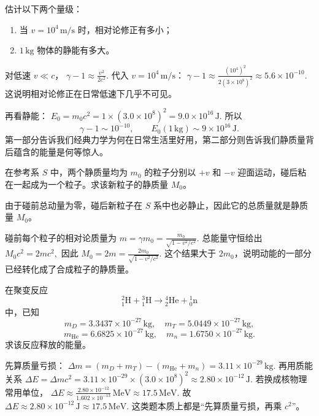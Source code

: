 \documentclass[lang=cn,11pt]{elegantbook}
\begin{document}
\begin{exercise}[低速修正量级与静能量级]
估计以下两个量级：
\begin{enumerate}
 \item 当 \(v=10^4\,\mathrm{m/s}\) 时，相对论修正有多小；
 \item \(1\,\mathrm{kg}\) 物体的静能有多大。
\end{enumerate}
\end{exercise}

\begin{solution}
对低速 \(v\ll c\)，
 \(\gamma-1\approx \frac{v^2}{2c^2}.\) 
代入 \(v=10^4\,\mathrm{m/s}\)：
 \(\gamma-1\approx \frac{(10^4)^2}{2(3\times 10^8)^2} \approx 5.6\times 10^{-10}.\) 
这说明相对论修正在日常低速下几乎不可见。

再看静能：
 \(E_0=m_0c^2=1\times (3.0\times 10^8)^2 =9.0\times 10^{16}\,\mathrm{J}.\) 
所以
\[
\boxed{\gamma-1\sim 10^{-10},\qquad E_0(1\,\mathrm{kg})\sim 9\times 10^{16}\,\mathrm{J}.}
\]
第一部分告诉我们经典力学为何在日常生活里好用，第二部分则告诉我们静质量背后蕴含的能量是何等惊人。
\end{solution}

\begin{exercise}[两个相向粒子粘在一起后的静质量]
在参考系 \(S\) 中，两个静质量均为 \(m_0\) 的粒子分别以 \(+v\) 和 \(-v\) 迎面运动，碰后粘在一起成为一个粒子。求该新粒子的静质量 \(M_0\)。
\end{exercise}

\begin{solution}
由于碰前总动量为零，碰后新粒子在 \(S\) 系中也必静止，因此它的总质量就是静质量 \(M_0\)。

碰前每个粒子的相对论质量为
 \(m=\gamma m_0=\frac{m_0}{\sqrt{1-v^2/c^2}}.\) 
总能量守恒给出
 \(M_0c^2=2mc^2,\) 
因此
 \(\boxed{ M_0=2m =\frac{2m_0}{\sqrt{1-v^2/c^2}}. }\) 
这个结果大于 \(2m_0\)，说明动能的一部分已经转化成了合成粒子的静质量。
\end{solution}

\begin{exercise}[氘氚聚变释放的能量]
在聚变反应
\[
{}^2_1\mathrm{H}+{}^3_1\mathrm{H}\to {}^4_2\mathrm{He}+{}^1_0\mathrm{n}
\]
中，已知
\[
m_D=3.3437\times 10^{-27}\,\mathrm{kg},\quad
m_T=5.0449\times 10^{-27}\,\mathrm{kg},
\]
\[
m_{\mathrm{He}}=6.6825\times 10^{-27}\,\mathrm{kg},\quad
m_n=1.6750\times 10^{-27}\,\mathrm{kg}.
\]
求该反应释放的能量。
\end{exercise}

\begin{solution}
先算质量亏损：
 \(\Delta m=(m_D+m_T)-(m_{\mathrm{He}}+m_n) =3.11\times 10^{-29}\,\mathrm{kg}.\) 
再用质能关系
 \(\Delta E=\Delta mc^2 =3.11\times 10^{-29}\times (3.0\times 10^8)^2 \approx 2.80\times 10^{-12}\,\mathrm{J}.\) 
若换成核物理常用单位，
 \(\Delta E\approx \frac{2.80\times 10^{-12}}{1.602\times 10^{-13}}\,\mathrm{MeV} \approx 17.5\,\mathrm{MeV}.\) 
故
 \(\boxed{\Delta E\approx 2.80\times 10^{-12}\,\mathrm{J}\approx 17.5\,\mathrm{MeV}.}\) 
这类题本质上都是“先算质量亏损，再乘 \(c^2\)”。
\end{solution}
\end{document}
